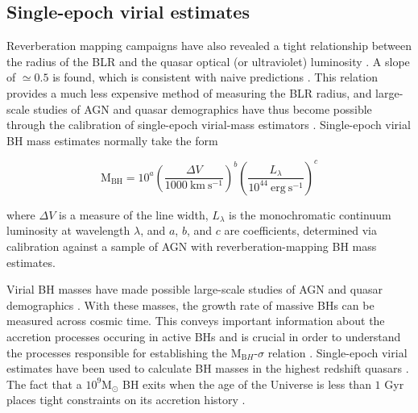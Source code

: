 \subsection{Single-epoch virial estimates}

Reverberation mapping campaigns have also revealed a tight relationship between the radius of the BLR and the quasar optical (or ultraviolet) luminosity \citep[the ${\mathrm R_{BLR}-L}$ relation; e.g.][]{kaspi00,kaspi07}.
A slope of $\simeq0.5$ is found, which is consistent with naive predictions \citep[e.g.][]{peterson97}. 
This relation provides a much less expensive method of measuring the BLR radius, and large-scale studies of AGN and quasar demographics have thus become possible through the calibration of single-epoch virial-mass estimators \citep[e.g.][]{vestergaard02,mclure02,vestergaard06,mcgill08,wang09,rafiee11,park13}.
Single-epoch virial BH mass estimates normally take the form

\begin{equation}
  \label{eq:virialmass}
  \mathrm{M_{BH}} = 10^{a} \left( \frac{\Delta V}{1000~\mathrm{km~s^{-1}}} \right)^b \left( \frac{L_{\lambda}}{10^{44}~\mathrm{erg~s^{-1}}} \right)^c
\end{equation}

\noindent where $\Delta V$ is a measure of the line width, $L_\lambda$ is the monochromatic continuum luminosity at wavelength $\lambda$, and $a$, $b$, and $c$ are coefficients, determined via calibration against a sample of AGN with reverberation-mapping BH mass estimates. 

Virial BH masses have made possible large-scale studies of AGN and quasar demographics \citep[e.g.][]{greene05b,vestergaard06,vestergaard09,shen11,shen12,trakhtenbrot12}. 
With these masses, the growth rate of massive BHs can be measured across cosmic time. 
This conveys important information about the accretion processes occuring in active BHs \citep[e.g.][]{kollmeier06} and is crucial in order to understand the processes responsible for establishing the M$_{\mathrm BH}$-$\sigma$ relation \citep[e.g.][]{bennert11}.
Single-epoch virial estimates have been used to calculate BH masses in the highest redshift quasars \citep[e.g. a $10^9$M$_\odot$ BH in a redshift $z\sim7$ quasar;][]{mortlock11}. 
The fact that a $10^9$M$_\odot$ BH exits when the age of the Universe is less than $1$ Gyr places tight constraints on its accretion history \citep[e.g.][]{willott03}. 

